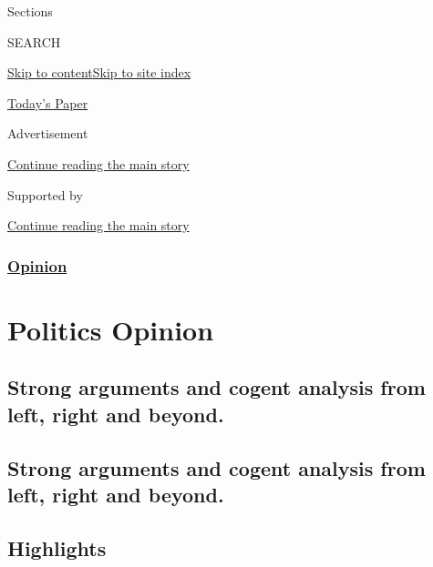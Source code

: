 Sections

SEARCH

\protect\hyperlink{site-content}{Skip to
content}\protect\hyperlink{site-index}{Skip to site index}

\href{https://myaccount.nytimes.com/auth/login?response_type=cookie\&client_id=vi}{}

\href{https://www.nytimes.com/section/todayspaper}{Today's Paper}

Advertisement

\protect\hyperlink{after-top}{Continue reading the main story}

Supported by

\protect\hyperlink{after-sponsor}{Continue reading the main story}

\hypertarget{opinion}{%
\subsubsection{\texorpdfstring{\href{/section/opinion}{Opinion}}{Opinion}}\label{opinion}}

\hypertarget{politics--opinion}{%
\section{Politics \textbar{} Opinion}\label{politics--opinion}}

\hypertarget{strong-arguments-and-cogent-analysis-from-left-right-and-beyond}{%
\subsection{Strong arguments and cogent analysis from left, right and
beyond.}\label{strong-arguments-and-cogent-analysis-from-left-right-and-beyond}}

\hypertarget{strong-arguments-and-cogent-analysis-from-left-right-and-beyond-1}{%
\subsection{Strong arguments and cogent analysis from left, right and
beyond.}\label{strong-arguments-and-cogent-analysis-from-left-right-and-beyond-1}}

\hypertarget{highlights}{%
\subsection{Highlights}\label{highlights}}

